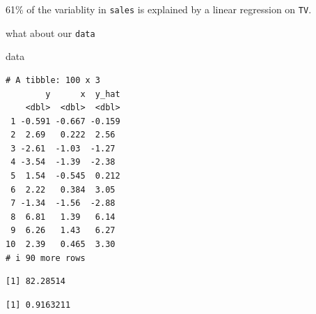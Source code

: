 \documentclass[
  letterpaper,
  DIV=11,
  numbers=noendperiod]{scrreprt}
\newenvironment{Shaded}{\begin{snugshade}}{\end{snugshade}}
\newcommand{\DecValTok}[1]{\textcolor[rgb]{0.47,0.16,0.63}{#1}}
\newcommand{\FunctionTok}[1]{\textcolor[rgb]{0.02,0.16,0.49}{#1}}
\newcommand{\NormalTok}[1]{\textcolor[rgb]{0.33,0.33,0.33}{#1}}
\newcommand{\OtherTok}[1]{\textcolor[rgb]{0.85,0.12,0.09}{#1}}
\newcommand{\SpecialCharTok}[1]{\textcolor[rgb]{0.00,0.46,0.62}{#1}}
\begin{document}
61\% of the variablity in \texttt{sales} is explained by a linear
regression on \texttt{TV}.

what about our \texttt{data}

\begin{Shaded}
\begin{Highlighting}[]
\NormalTok{data}
\end{Highlighting}
\end{Shaded}

\begin{verbatim}
# A tibble: 100 x 3
        y      x  y_hat
    <dbl>  <dbl>  <dbl>
 1 -0.591 -0.667 -0.159
 2  2.69   0.222  2.56 
 3 -2.61  -1.03  -1.27 
 4 -3.54  -1.39  -2.38 
 5  1.54  -0.545  0.212
 6  2.22   0.384  3.05 
 7 -1.34  -1.56  -2.88 
 8  6.81   1.39   6.14 
 9  6.26   1.43   6.27 
10  2.39   0.465  3.30 
# i 90 more rows
\end{verbatim}

\begin{Shaded}
\end{Shaded}

\begin{verbatim}
[1] 82.28514
\end{verbatim}

\begin{Shaded}
\end{Shaded}

\begin{verbatim}
[1] 0.9163211
\end{verbatim}

\begin{Shaded}
\end{Shaded}
\end{document}
